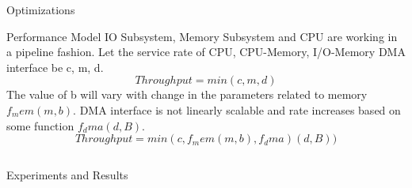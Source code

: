 \documentclass[final]{beamer}
\newlength{\twocolwid}
\begin{document}
\begin{frame}
\begin{columns}[t]
\begin{column}{\twocolwid}
\begin{exampleblock}{Optimizations}
\begin{multicols}{3}
\end{multicols}

\end{exampleblock}



\begin{alertblock}{Performance Model}
IO Subsystem, Memory Subsystem and CPU are working in a pipeline fashion. Let the service rate of CPU, CPU-Memory, I/O-Memory DMA interface be c, m, d.
$$Throughput = min(c, m, d)$$
The value of b will vary with change in the parameters related to memory $f_mem(m, b)$. DMA interface is not linearly scalable and rate increases based on some 
function $f_dma (d,B)$.
$$Throughput = min(c, f_mem(m, b), f_dma)(d, B))$$
\end{alertblock} 


\begin{columns}[t,totalwidth=\twocolwid] %
\begin{column}{\twocolwid} %
\begin{exampleblock}{Experiments and Results}
\begin{multicols}{3}


\end{multicols}
\end{exampleblock}
\end{column}
\end{columns}
\end{column}
\end{columns}
\end{frame}
\end{document}
